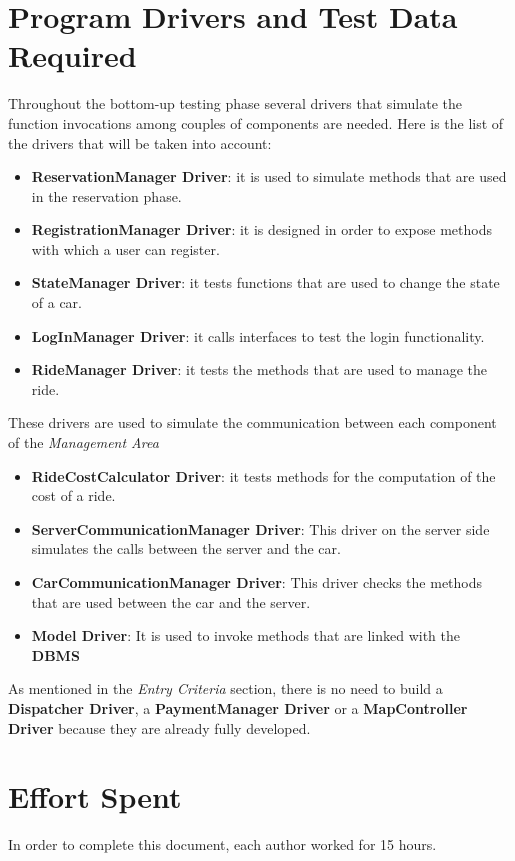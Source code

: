 \documentclass[11pt,a4paper]{report}
\begin{document}
\chapter[Program Drivers and Test Data Required]{Program Drivers and Test Data\\Required}
Throughout the bottom-up testing phase several drivers that simulate the function invocations among couples of components are needed.
Here is the list of the drivers that will be taken into account:
\begin{itemize}
	\item \textbf{ReservationManager Driver}: it is used to simulate methods that are used in the reservation phase.
	\item \textbf{RegistrationManager Driver}: it is designed in order to expose methods with which a user can register.
	\item \textbf{StateManager Driver}: it tests functions that are used to change the state of a car.
	\item \textbf{LogInManager Driver}: it calls interfaces to test the login functionality.
	\item \textbf{RideManager Driver}: it tests the methods that are used to manage the ride.
\end{itemize}
These drivers are used to simulate the communication between each component of the \textit{Management Area}
\begin{itemize}
	\item \textbf{RideCostCalculator Driver}: it tests methods for the computation of the cost of a ride.
\end{itemize}
\begin{itemize}
	\item \textbf{ServerCommunicationManager Driver}: This driver on the server side simulates the calls between the server and the car.
	\item \textbf{CarCommunicationManager Driver}: This driver checks the methods that are used between the car and the server.
\end{itemize}
\begin{itemize}
	\item \textbf{Model Driver}: It is used to invoke methods that are linked with the \textbf{DBMS}
\end{itemize}
As mentioned in the \textit{Entry Criteria} section, there is no need to build a \textbf{Dispatcher Driver}, a \textbf{PaymentManager Driver} or a \textbf{MapController Driver} because they are already fully developed.
\chapter{Effort Spent}
In order to complete this document, each author worked for 15 hours.
\end{document}
